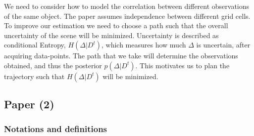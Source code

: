 \documentclass{article}
\begin{document}
	We need to consider how to model the correlation between different observations of the same object. The paper assumes independence between different grid cells.
	To improve our estimation we need to choose a path such that the overall uncertainty of the scene will be minimized.
	Uncertainty is described as conditional Entropy, $H(\Delta|D^t)$, which measures how much $\Delta$ is uncertain, after acquiring data-points. The path that we take will determine the observations obtained, and thus the posterior $p(\Delta|D^t)$. This motivates us to plan the trajectory such that $H(\Delta|D^t)$ will be minimized.
	
	\subsection{Paper (2)}
	\subsubsection{Notations and definitions}
\end{document}
